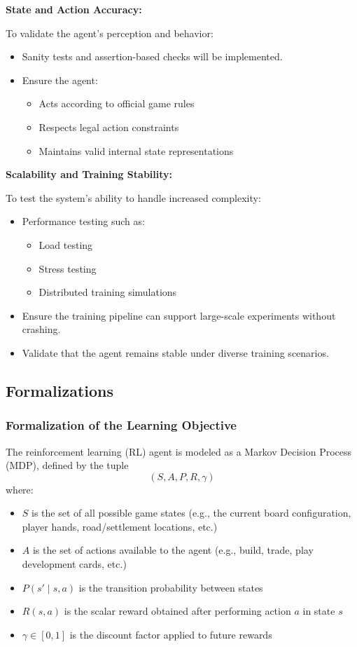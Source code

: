 \documentclass{article}
\begin{document}
\noindent\textbf{State and Action Accuracy:}

To validate the agent’s perception and behavior:
\begin{itemize}
    \item Sanity tests and assertion-based checks will be implemented.
    \item Ensure the agent:
    \begin{itemize}
        \item Acts according to official game rules
        \item Respects legal action constraints
        \item Maintains valid internal state representations
    \end{itemize}
\end{itemize}

\noindent\textbf{Scalability and Training Stability:}

To test the system’s ability to handle increased complexity:
\begin{itemize}
    \item Performance testing such as:
    \begin{itemize}
        \item Load testing
        \item Stress testing
        \item Distributed training simulations
    \end{itemize}
    \item Ensure the training pipeline can support large-scale experiments without crashing.
    \item Validate that the agent remains stable under diverse training scenarios.
\end{itemize}

\subsection{Formalizations}
\subsubsection{Formalization of the Learning Objective}
\label{sec:formalization}

The reinforcement learning (RL) agent is modeled as a Markov Decision Process (MDP), defined by the tuple
\[
(S, A, P, R, \gamma)
\]
where:
\begin{itemize}
    \item $S$ is the set of all possible game states (e.g., the current board configuration, player hands, road/settlement locations, etc.)
    \item $A$ is the set of actions available to the agent (e.g., build, trade, play development cards, etc.)
    \item $P(s' \mid s, a)$ is the transition probability between states
    \item $R(s, a)$ is the scalar reward obtained after performing action $a$ in state $s$
    \item $\gamma \in [0, 1]$ is the discount factor applied to future rewards
\end{itemize}
\end{document}
